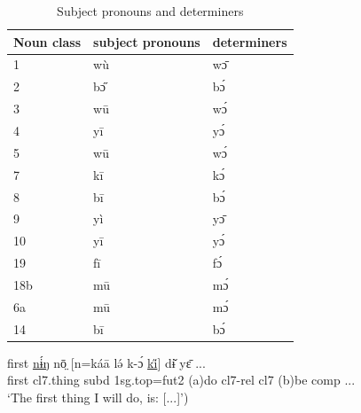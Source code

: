 \documentclass[10pt,twoside]{article}
\def\ci#1{{\ipaFont #1}}
\newcommand{\gl}[1]{`#1'}
\def\VSP{\vspace{0pt}}
\newcommand{\cl}[1]{{\sc cl#1}}
\def\Hline{\hline}
\begin{document}
\begin{table}[h!]%
	\centering
	\begin{tabular}[t]{p{3.5cm} l l } \Hline
	Noun class	&	{\sc subject pronouns}		& {\sc determiners}\\
	\Hline
			1		&	\ci{wù}	& \ci{wɔ̄}		\\			
			2		&	\ci{bɔ̋} 	& \ci{bɔ́}		\\
			3		&	\ci{wū}	& \ci{wɔ́}		\\
			4		&	 \ci{yī}	& \ci{yɔ́}		\\
			5		&	\ci{wū}	& \ci{wɔ́}		\\
			7		& 	\ci{kī}	& \ci{kɔ́}		\\
			8		& 	\ci{bī}	& \ci{bɔ́}		\\
			9		& 	\ci{yì}	& \ci{yɔ̄}		\\
			10		& 	\ci{yī}	& \ci{yɔ́}		\\
			19		&	\ci{fī}	& \ci{fɔ́}		\\
			18b		&	\ci{mū}	& \ci{mɔ́}		\\			
			6a		&	\ci{mū}	& \ci{mɔ́}		\\	
			14		& 	\ci{bī}	& \ci{bɔ́}		\\	

	\Hline	
	\end{tabular}
	\caption{Subject pronouns and determiners} \label{tabPronounsDeterminers}
\end{table} 

\begin{exe}
	\ex \label{exTheFirstThing} 		
		\gll first \uline{nɨ́ŋ} nō̤ [n=káā lə́ k-ɔ́ \uline{ki̋}] dɨ̌ yɛ̄ ...\\
		first	\cl7.thing	{\sc subd} {\sc 1sg.top}={\sc fut2}	({\sc a})do	\cl7-{\sc rel}	\cl7 	({\sc b})be	 {\sc comp}	... \\
		\glt \VSP \gl{The first thing I will do, is: [...]})
\end{exe}%
\end{document}
